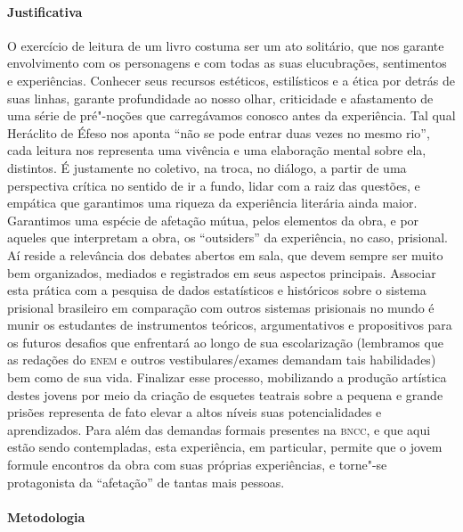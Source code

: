 \documentclass[11pt]{extarticle}
\begin{document}
\paragraph{Justificativa} O exercício de leitura de um livro costuma ser
um ato solitário, que nos garante envolvimento com os personagens e com
todas as suas elucubrações, sentimentos e experiências. Conhecer seus
recursos estéticos, estilísticos e a ética por detrás de suas linhas,
garante profundidade ao nosso olhar, criticidade e afastamento de uma
série de pré"-noções que carregávamos conosco antes da experiência. Tal
qual Heráclito de Éfeso nos aponta ``não se pode entrar duas vezes no
mesmo rio'', cada leitura nos representa uma vivência e uma elaboração
mental sobre ela, distintos. É justamente no coletivo, na troca, no
diálogo, a partir de uma perspectiva crítica no sentido de ir a fundo,
lidar com a raiz das questões, e empática que garantimos uma riqueza da
experiência literária ainda maior. Garantimos uma espécie de afetação
mútua, pelos elementos da obra, e por aqueles que interpretam a obra, os
``outsiders'' da experiência, no caso, prisional. Aí reside a relevância
dos debates abertos em sala, que devem sempre ser muito bem organizados,
mediados e registrados em seus aspectos principais. Associar esta
prática com a pesquisa de dados estatísticos e históricos sobre o
sistema prisional brasileiro em comparação com outros sistemas
prisionais no mundo é munir os estudantes de instrumentos teóricos,
argumentativos e propositivos para os futuros desafios que enfrentará ao
longo de sua escolarização (lembramos que as redações do \textsc{enem} e outros
vestibulares/exames demandam tais habilidades) bem como de sua vida.
Finalizar esse processo, mobilizando a produção artística destes jovens
por meio da criação de esquetes teatrais sobre a pequena e grande
prisões representa de fato elevar a altos níveis suas potencialidades e
aprendizados. Para além das demandas formais presentes na \textsc{bncc}, e que
aqui estão sendo contempladas, esta experiência, em particular, permite
que o jovem formule encontros da obra com suas próprias experiências, e
torne"-se protagonista da ``afetação'' de tantas mais pessoas.


\paragraph{Metodologia} 
\end{document}
